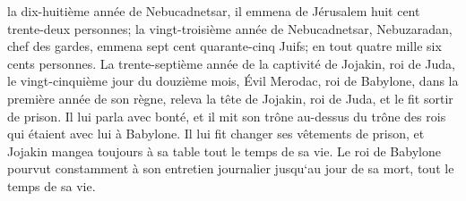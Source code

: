 \verse la dix-huitième année de Nebucadnetsar, il emmena de Jérusalem huit cent trente-deux personnes; 
\verse la vingt-troisième année de Nebucadnetsar, Nebuzaradan, chef des gardes, emmena sept cent quarante-cinq Juifs; en tout quatre mille six cents personnes. 
\verse La trente-septième année de la captivité de Jojakin, roi de Juda, le vingt-cinquième jour du douzième mois, Évil Merodac, roi de Babylone, dans la première année de son règne, releva la tête de Jojakin, roi de Juda, et le fit sortir de prison. 
\verse Il lui parla avec bonté, et il mit son trône au-dessus du trône des rois qui étaient avec lui à Babylone. 
\verse Il lui fit changer ses vêtements de prison, et Jojakin mangea toujours à sa table tout le temps de sa vie. 
\verse Le roi de Babylone pourvut constamment à son entretien journalier jusqu`au jour de sa mort, tout le temps de sa vie. 
